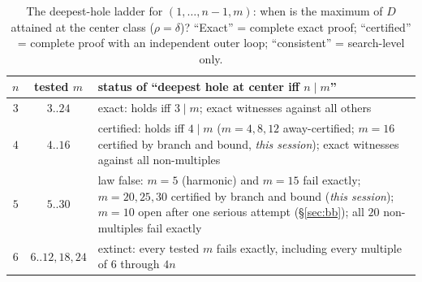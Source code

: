 \begin{table}[htbp]
\centering
\small
\caption{The deepest-hole ladder for $(1,\dots,n{-}1,m)$: when is the
maximum of $D$ attained at the center class ($\rho=\delta$)?
``Exact'' = complete exact proof; ``certified'' = complete proof with an
independent outer loop; ``consistent'' = search-level only.}
\label{tab:ladder}
\begin{tabularx}{\textwidth}{@{} c c >{\raggedright\arraybackslash}X @{}}
\toprule
$n$ & tested $m$ & status of ``deepest hole at center iff $n\mid m$''
\\
\midrule
$3$ & $3..24$ & exact: holds iff $3\mid m$; exact witnesses against all
others \\
$4$ & $4..16$ & certified: holds iff $4\mid m$ ($m=4,8,12$
away-certified; $m=16$ certified by branch and bound, \emph{this
session}); exact witnesses against all non-multiples \\
$5$ & $5..30$ & law false: $m=5$ (harmonic) and $m=15$ fail exactly;
$m=20,25,30$ certified by branch and bound (\emph{this session});
$m=10$ open after one serious attempt (\S\ref{sec:bb}); all $20$
non-multiples fail exactly \\
$6$ & $6..12,18,24$ & extinct: every tested $m$ fails exactly, including
every multiple of $6$ through $4n$ \\
\bottomrule
\end{tabularx}
\end{table}

